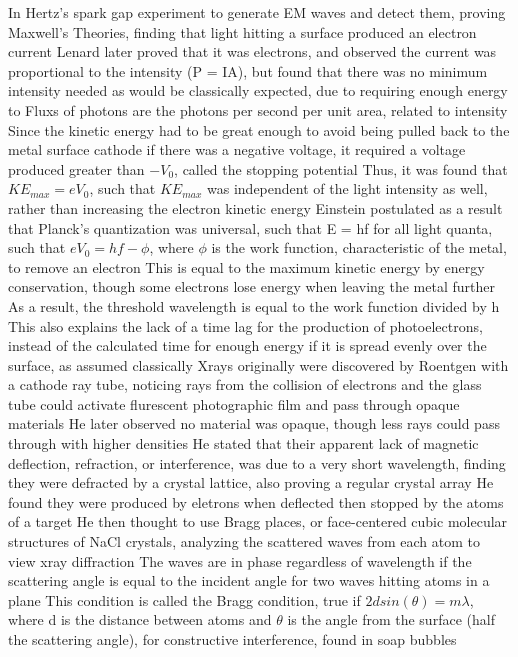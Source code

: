 \documentclass[11 pt, twoside]{article}
\newenvironment{outline*}
{
	\begin{outline}[enumerate]
	}
	{\end{outline}
}
\begin{document}
\begin{outline*}
\1 In Hertz's spark gap experiment to generate EM waves and detect them, proving Maxwell's Theories, finding that light hitting a surface produced an electron current
	\2 Lenard later proved that it was electrons, and observed the current was proportional to the intensity (P = IA), but found that there was no minimum intensity needed as would be classically expected, due to requiring enough energy to
		\3 Fluxs of photons are the photons per second per unit area, related to intensity 
		\3 Since the kinetic energy had to be great enough to avoid being pulled back to the metal surface cathode if there was a negative voltage, it required a voltage produced greater than $-V_0$, called the stopping potential
		\3 Thus, it was found that $KE_{max} = eV_0$, such that $KE_{max}$ was independent of the light intensity as well, rather than increasing the electron kinetic energy
	\2 Einstein postulated as a result that Planck's quantization was universal, such that E = hf for all light quanta, such that $eV_0 = hf - \phi$, where $\phi$ is the work function, characteristic of the metal, to remove an electron
		\3 This is equal to the maximum kinetic energy by energy conservation, though some electrons lose energy when leaving the metal further
		\3 As a result, the threshold wavelength is equal to the work function divided by h
		\3 This also explains the lack of a time lag for the production of photoelectrons, instead of the calculated time for enough energy if it is spread evenly over the surface, as assumed classically
\1 Xrays originally were discovered by Roentgen with a cathode ray tube, noticing rays from the collision of electrons and the glass tube could activate flurescent photographic film and pass through opaque materials
	\2 He later observed no material was opaque, though less rays could pass through with higher densities
	\2 He stated that their apparent lack of magnetic deflection, refraction, or interference, was due to a very short wavelength, finding they were defracted by a crystal lattice, also proving a regular crystal array
	\2 He found they were produced by eletrons when deflected then stopped by the atoms of a target
	\2 He then thought to use Bragg places, or face-centered cubic molecular structures of NaCl crystals, analyzing the scattered waves from each atom to view xray diffraction
		\3 The waves are in phase regardless of wavelength if the scattering angle is equal to the incident angle for two waves hitting atoms in a plane
		\3 This condition is called the Bragg condition, true if $2dsin(\theta) = m\lambda$, where d is the distance between atoms and $\theta$ is the angle from the surface (half the scattering angle), for constructive interference, found in soap bubbles

\end{outline*}
\end{document}
